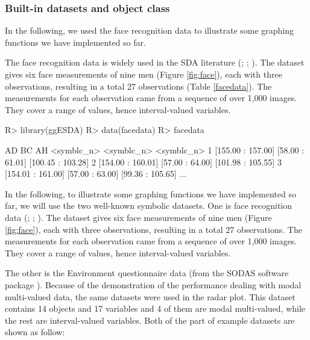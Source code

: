 \documentclass[article]{jss}
\begin{document}
\subsubsection{Built-in datasets and object class}
In the following, we used the face recognition
data to illustrate some graphing functions we have implemented so far.

The face recognition data is widely used in the SDA literature (\cite{leroy:1996}; \cite{douzal:2011}; \cite{le:2012}). The dataset gives six face measurements of nine
men (Figure \ref{fig:face}), each with three observations, resulting in a
total 27 observations (Table \ref{facedata}). The measurements for
each observation came from a sequence of over 1,000 images. They cover
a range of values, hence interval-valued variables.


\begin{CodeChunk}
\begin{CodeInput}
R> library(ggESDA)
R> data(facedata)
R> facedata
\end{CodeInput}
\begin{CodeOutput}
                 AD              BC                AH
         <symblc_n>      <symblc_n>        <symblc_n>
1 [155.00 : 157.00] [58.00 : 61.01] [100.45 : 103.28]
2 [154.00 : 160.01] [57.00 : 64.00] [101.98 : 105.55]
3 [154.01 : 161.00] [57.00 : 63.00]  [99.36 : 105.65]
...
\end{CodeOutput}
\end{CodeChunk}




In the following, to illustrate some graphing functions we have implemented so far, we will use the two well-known symbolic datasets. One is face recognition data (\cite{leroy:1996}; \cite{douzal:2011}; \cite{le:2012}). The dataset gives six face measurements of nine men (Figure \ref{fig:face}), each with three observations, resulting in a total 27 observations. The measurements for each observation came from a sequence of over 1,000 images. They cover a range of values, hence interval-valued variables. 

The other is the Environment questionnaire data (from the SODAS software package \cite{diday:2008}). Because of the demonstration of the performance dealing with modal multi-valued data, the same datasets were used in the radar plot. This dataset contains 14 objects and 17 variables and 4 of them are modal multi-valued, while the rest are interval-valued variables. Both of the part of example datasets are shown as follow:
\end{document}
